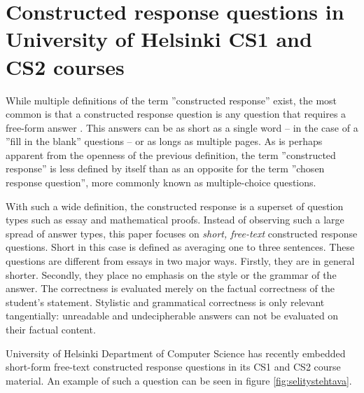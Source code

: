 \documentclass[english]{tktltiki2}
\theoremstyle{definition}
\theoremstyle{remark}
\begin{document}
\section{Constructed response questions in University of Helsinki CS1 and CS2 courses}

While multiple definitions of the term ''constructed response'' exist, the most common is that a constructed response question is any question that requires a free-form answer \cite{bennett91}. This answers can be as short as a single word -- in the case of a ''fill in the blank'' questions -- or as longs as multiple pages. As is perhaps apparent from the openness of the previous definition, the term ''constructed response'' is less defined by itself than as an opposite for the term ''chosen response question'', more commonly known as multiple-choice questions.

With such a wide definition, the constructed response is a superset of question types such as essay and mathematical proofs. 
Instead of observing such a large spread of answer types, this paper focuses on \emph{short, free-text} constructed response questions. Short in this case is defined as averaging one to three sentences. These questions are different from essays in two major ways. Firstly, they are in general shorter. Secondly, they place no emphasis on the style or the grammar of the answer. The correctness is evaluated merely on the factual correctness of the student's statement. Stylistic and grammatical correctness is only relevant tangentially: unreadable and undecipherable answers can not be evaluated on their factual content.

University of Helsinki Department of Computer Science has recently embedded short-form free-text constructed response questions in its CS1 and CS2 course material. An example of such a question can be seen in figure \ref{fig:selitystehtava}.
\end{document}
